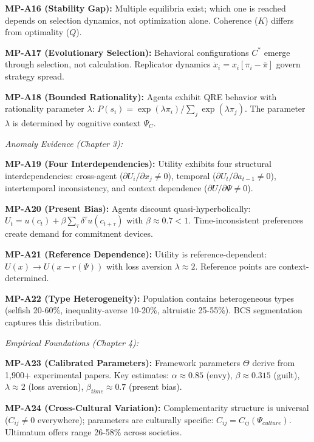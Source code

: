 \begin{tcolorbox}[colback=gray!5!white, colframe=gray!75!black,
    title=\textbf{MP Axioms}]
\textbf{MP-A16 (Stability Gap):} Multiple equilibria exist; which one is reached depends on selection dynamics, not optimization alone. Coherence ($K$) differs from optimality ($Q$).

\textbf{MP-A17 (Evolutionary Selection):} Behavioral configurations $C^*$ emerge through selection, not calculation. Replicator dynamics $\dot{x}_i = x_i[\pi_i - \bar{\pi}]$ govern strategy spread.

\textbf{MP-A18 (Bounded Rationality):} Agents exhibit QRE behavior with rationality parameter $\lambda$: $P(s_i) = \exp(\lambda\pi_i)/\sum_j\exp(\lambda\pi_j)$. The parameter $\lambda$ is determined by cognitive context $\Psi_C$.

\vspace{0.5em}
\textit{Anomaly Evidence (Chapter 3):}

\textbf{MP-A19 (Four Interdependencies):} Utility exhibits four structural interdependencies: cross-agent ($\partial U_i/\partial x_j \neq 0$), temporal ($\partial U_t/\partial a_{t-1} \neq 0$), intertemporal inconsistency, and context dependence ($\partial U/\partial \Psi \neq 0$).

\textbf{MP-A20 (Present Bias):} Agents discount quasi-hyperbolically: $U_t = u(c_t) + \beta\sum_\tau \delta^\tau u(c_{t+\tau})$ with $\beta \approx 0.7 < 1$. Time-inconsistent preferences create demand for commitment devices.

\textbf{MP-A21 (Reference Dependence):} Utility is reference-dependent: $U(x) \to U(x - r(\Psi))$ with loss aversion $\lambda \approx 2$. Reference points are context-determined.

\textbf{MP-A22 (Type Heterogeneity):} Population contains heterogeneous types (selfish 20-60\%, inequality-averse 10-20\%, altruistic 25-55\%). BCS segmentation captures this distribution.

\vspace{0.5em}
\textit{Empirical Foundations (Chapter 4):}

\textbf{MP-A23 (Calibrated Parameters):} Framework parameters $\Theta$ derive from 1,900+ experimental papers. Key estimates: $\alpha \approx 0.85$ (envy), $\beta \approx 0.315$ (guilt), $\lambda \approx 2$ (loss aversion), $\beta_{time} \approx 0.7$ (present bias).

\textbf{MP-A24 (Cross-Cultural Variation):} Complementarity structure is universal ($C_{ij} \neq 0$ everywhere); parameters are culturally specific: $C_{ij} = C_{ij}(\Psi_{culture})$. Ultimatum offers range 26-58\% across societies.


\end{tcolorbox}

